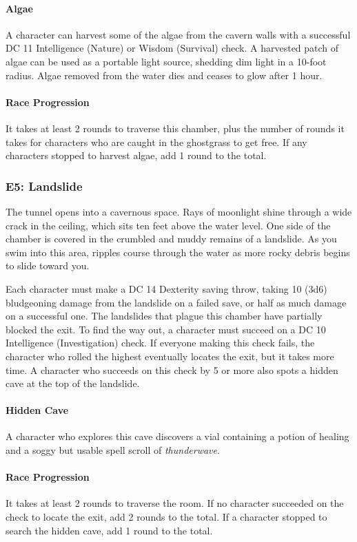 \documentclass[10pt,a4,twoside,twocolumn,openany,nodeprecatedcode]{dndbook}
\begin{document}
\paragraph{Algae}
A character can harvest some of the algae from the cavern walls with a successful DC 11 Intelligence (Nature) or Wisdom (Survival) check. A harvested patch of algae can be used as a portable light source, shedding dim light in a 10-foot radius. Algae removed from the water dies and ceases to glow after 1 hour.
\paragraph{Race Progression}
It takes at least 2 rounds to traverse this chamber, plus the number of rounds it takes for characters who are caught in the ghostgrass to get free. If any characters stopped to harvest algae, add 1 round to the total.
\subsubsection{E5: Landslide}
\begin{DndReadAloud}{}
The tunnel opens into a cavernous space. Rays of moonlight shine through a wide crack in the ceiling, which sits ten feet above the water level. One side of the chamber is covered in the crumbled and muddy remains of a landslide.
As you swim into this area, ripples course through the water as more rocky debris begins to slide toward you.
\end{DndReadAloud}

Each character must make a DC 14 Dexterity saving throw, taking 10 (3d6) bludgeoning damage from the landslide on a failed save, or half as much damage on a successful one.
The landslides that plague this chamber have partially blocked the exit. To find the way out, a character must succeed on a DC 10 Intelligence (Investigation) check. If everyone making this check fails, the character who rolled the highest eventually locates the exit, but it takes more time. A character who succeeds on this check by 5 or more also spots a hidden cave at the top of the landslide.
\paragraph{Hidden Cave}
A character who explores this cave discovers a vial containing a potion of healing and a soggy but usable spell scroll of \textit{thunderwave}.
\paragraph{Race Progression}
It takes at least 2 rounds to traverse the room. If no character succeeded on the check to locate the exit, add 2 rounds to the total. If a character stopped to search the hidden cave, add 1 round to the total.
\end{document}
